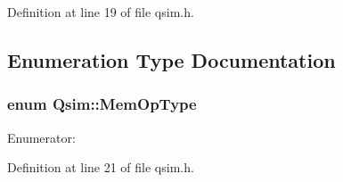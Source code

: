 Definition at line 19 of file qsim.h.

\subsection{Enumeration Type Documentation}
\subsubsection[{MemOpType}]{\setlength{\rightskip}{0pt plus 5cm}enum {\bf Qsim::MemOpType}}\label{namespaceQsim_ba3ad1d874e99c4b3e63b87c7f210cb5}


\begin{Desc}
\item[Enumerator: ]\par
\begin{description}
\item[{\em 
MEM\_\-READ\label{namespaceQsim_ba3ad1d874e99c4b3e63b87c7f210cb56864b6e2eb97e0b7120bfcc42a69b091}
}]\item[{\em 
MEM\_\-WRITE\label{namespaceQsim_ba3ad1d874e99c4b3e63b87c7f210cb58e807db994e9135c48d375e034f90886}
}]\end{description}
\end{Desc}



Definition at line 21 of file qsim.h.